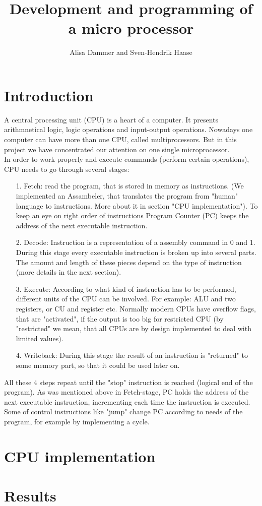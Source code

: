 \documentclass[11pt,twoside,a4paper]{article}
\begin{document}
\title{Development and programming of a micro processor}
\author{Alisa Dammer and Sven-Hendrik Haase}
\maketitle

\section{Introduction}
A central processing unit (CPU) is a heart of a computer. It presents arithmnetical logic, logic operations and input-output operations. Nowadays one computer can have more than one CPU, called multiprocessors. But in this project we have concentrated our attention on one single microprocessor.\\
In order to work properly and execute commands (perform certain operations), CPU needs to go through several stages:\\
\begin{enumerate}
	\item[1.] Fetch: read the program, that is stored in memory as instructions. (We implemented an Assambeler, that translates the program from "human" language to instructions. More about it in  section "CPU implementation"). To keep an eye on right order of instructions Program Counter (PC) keeps the address of the next executable instruction.
	\item[2.] Decode: Instruction is a representation of a assembly command in 0 and 1. During this stage every executable instruction is broken up into several parts. The amount and length of these pieces depend on the type of instruction (more details in the next section). 
	\item[3.] Execute: According to what kind of instruction has to be performed, different units of the CPU can be involved. For example: ALU and two registers, or CU and register etc. Normally modern CPUs have overflow flags, that are "activated", if the output is too big for restricted CPU (by "restricted" we mean, that all CPUs are by design implemented to deal with limited values).
	\item[4.] Writeback: During this stage the result of an instruction is "returned" to some memory part, so that it could be used later on.
	
\end{enumerate}
All these 4 steps repeat until the "stop" instruction is reached (logical end of the program). As was mentioned above in Fetch-stage, PC holds the address of the next executable instruction, incrementing each time the instruction is executed. Some of control instructions like "jump" change PC according to needs of the program, for example by implementing a cycle.

\section{CPU implementation}
\section{Results}
\end{document}
